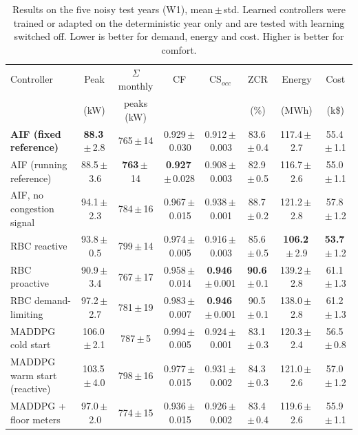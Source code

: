 \documentclass[conference]{IEEEtran}
\newcommand{\pmx}{\,$\pm$\,}
\begin{document}
\begin{table}[t]
\caption{Results on the five noisy test years (W1), mean\,$\pm$\,std. Learned
controllers were trained or adapted on the deterministic year only and are
tested with learning switched off. Lower is better for demand, energy and
cost. Higher is better for comfort.}
\label{tab:w1}
\centering
\footnotesize
\begin{tabular}{lccccccc}
\toprule
Controller & Peak & $\Sigma$ monthly & CF & CS$_{occ}$ & ZCR & Energy & Cost \\
 & (kW) & peaks (kW) & & & (\%) & (MWh) & (k\$) \\
\midrule
\textbf{AIF (fixed reference)} & \textbf{88.3}\pmx2.8 & 765\pmx14 & 0.929\pmx0.030 & 0.912\pmx0.003 & 83.6\pmx0.4 & 117.4\pmx2.7 & 55.4\pmx1.1 \\
AIF (running reference)     & 88.5\pmx3.6 & \textbf{763}\pmx14 & \textbf{0.927}\pmx0.028 & 0.908\pmx0.003 & 82.9\pmx0.5 & 116.7\pmx2.6 & 55.0\pmx1.1 \\
AIF, no congestion signal   & 94.1\pmx2.3 & 784\pmx16 & 0.967\pmx0.015 & 0.938\pmx0.001 & 88.7\pmx0.2 & 121.2\pmx2.8 & 57.8\pmx1.2 \\
RBC reactive                & 93.8\pmx0.5 & 799\pmx14 & 0.974\pmx0.005 & 0.916\pmx0.003 & 85.6\pmx0.5 & \textbf{106.2}\pmx2.9 & \textbf{53.7}\pmx1.2 \\
RBC proactive               & 90.9\pmx3.4 & 767\pmx17 & 0.958\pmx0.014 & \textbf{0.946}\pmx0.001 & \textbf{90.6}\pmx0.1 & 139.2\pmx2.8 & 61.1\pmx1.3 \\
RBC demand-limiting         & 97.2\pmx2.7 & 781\pmx19 & 0.983\pmx0.007 & \textbf{0.946}\pmx0.001 & 90.5\pmx0.1 & 138.0\pmx2.8 & 61.2\pmx1.3 \\
MADDPG cold start           & 106.0\pmx2.1 & 787\pmx5 & 0.994\pmx0.005 & 0.924\pmx0.001 & 83.1\pmx0.3 & 120.3\pmx2.4 & 56.5\pmx0.8 \\
MADDPG warm start (reactive)& 103.5\pmx4.0 & 798\pmx16 & 0.977\pmx0.015 & 0.931\pmx0.002 & 84.3\pmx0.3 & 121.0\pmx2.6 & 57.0\pmx1.2 \\
MADDPG + floor meters       & 97.0\pmx2.0 & 774\pmx15 & 0.936\pmx0.015 & 0.926\pmx0.002 & 83.4\pmx0.4 & 119.6\pmx2.6 & 55.9\pmx1.1 \\
\end{tabular}
\end{table}
\end{document}
